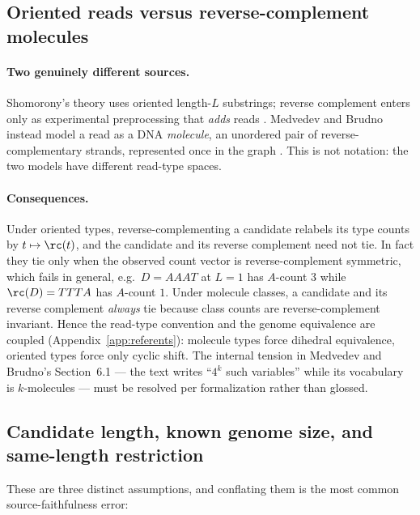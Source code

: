\subsection{Oriented reads versus reverse-complement molecules}

\paragraph{Two genuinely different sources.}
Shomorony's theory uses oriented length-$L$ substrings; reverse complement enters
only as experimental preprocessing that \emph{adds} reads \parencite[\S4.1]{shomorony2016}.
Medvedev and Brudno instead model a read as a DNA \emph{molecule}, an unordered
pair of reverse-complementary strands, represented once in the graph
\parencite[\S3.1,\S4.1]{medvedev2009}. This is not notation: the two models have
different read-type spaces.

\paragraph{Consequences.}
Under oriented types, reverse-complementing a candidate relabels its type counts
by $t\mapsto\rc(t)$, and the candidate and its reverse complement need not tie.
In fact they tie only when the observed count vector is reverse-complement
symmetric, which fails in general, e.g.\ $D=AAAT$ at $L=1$ has $A$-count $3$
while $\rc(D)=TTTA$ has $A$-count $1$. Under molecule classes, a candidate and
its reverse complement \emph{always} tie because class counts are
reverse-complement invariant. Hence the read-type convention and the genome
equivalence are coupled (Appendix~\ref{app:referents}): molecule types force dihedral
equivalence, oriented types force only cyclic shift. The internal tension in
Medvedev and Brudno's Section~6.1 --- the text writes ``$4^k$ such variables''
while its vocabulary is $k$-molecules --- must be resolved per formalization
rather than glossed.

\subsection{Candidate length, known genome size, and same-length restriction}

These are three distinct assumptions, and conflating them is the most common
source-faithfulness error:

